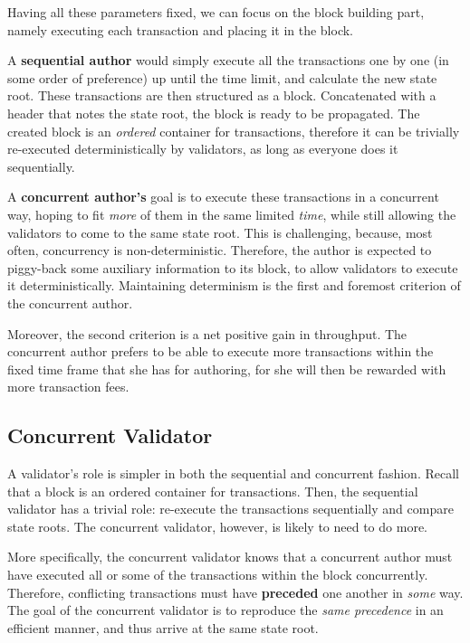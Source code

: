 Having all these parameters fixed, we can focus on the block building part, namely executing each
transaction and placing it in the block.

A \textbf{sequential author} would simply execute all the transactions one by one (in some order of
preference) up until the time limit, and calculate the new state root. These transactions are then
structured as a block. Concatenated with a header that notes the state root, the block is ready to
be propagated. The created block is an \textit{ordered} container for transactions, therefore it can
be trivially re-executed deterministically by validators, as long as everyone does it sequentially.

A \textbf{concurrent author's} goal is to execute these transactions in a concurrent way, hoping to
fit \textit{more} of them in the same limited \textit{time}, while still allowing the validators to
come to the same state root. This is challenging, because, most often, concurrency is
non-deterministic. Therefore, the author is expected to piggy-back some auxiliary information to its
block, to allow validators to execute it deterministically. Maintaining determinism is the first and
foremost criterion of the concurrent author.

Moreover, the second criterion is a net positive gain in throughput. The concurrent author prefers
to be able to execute more transactions within the fixed time frame that she has for authoring, for
she will then be rewarded with more transaction fees.

\subsection{Concurrent Validator} \label{chap_appraoch:subsec:concurrent_validator}

A validator's role is simpler in both the sequential and concurrent fashion. Recall that a block is
an ordered container for transactions. Then, the sequential validator has a trivial role: re-execute
the transactions sequentially and compare state roots. The concurrent validator, however, is likely
to need to do more.

More specifically, the concurrent validator knows that a concurrent author must have executed all or
some of the transactions within the block concurrently. Therefore, conflicting transactions must
have \textbf{preceded} one another in \textit{some} way. The goal of the concurrent validator is to
reproduce the \textit{same precedence} in an efficient manner, and thus arrive at the same state
root.

